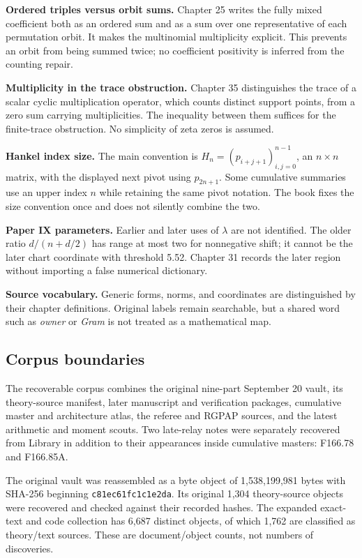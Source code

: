 \documentclass[
  10pt,
  a4paper,
  10pt,
  oneside,
  openany]{book}
\begin{document}
\textbf{Ordered triples versus orbit sums.} Chapter 25 writes the fully
mixed coefficient both as an ordered sum and as a sum over one
representative of each permutation orbit. It makes the multinomial
multiplicity explicit. This prevents an orbit from being summed twice;
no coefficient positivity is inferred from the counting repair.

\textbf{Multiplicity in the trace obstruction.} Chapter 35 distinguishes
the trace of a scalar cyclic multiplication operator, which counts
distinct support points, from a zero sum carrying multiplicities. The
inequality between them suffices for the finite-trace obstruction. No
simplicity of zeta zeros is assumed.

\textbf{Hankel index size.} The main convention is
\(H_n=(p_{i+j+1})_{i,j=0}^{n-1}\), an \(n\times n\) matrix, with the
displayed next pivot using \(p_{2n+1}\). Some cumulative summaries use
an upper index \(n\) while retaining the same pivot notation. The book
fixes the size convention once and does not silently combine the two.

\textbf{Paper IX parameters.} Earlier and later uses of \(\lambda\) are
not identified. The older ratio \(d/(n+d/2)\) has range at most two for
nonnegative shift; it cannot be the later chart coordinate with
threshold 5.52. Chapter 31 records the later region without importing a
false numerical dictionary.

\textbf{Source vocabulary.} Generic forms, norms, and coordinates are
distinguished by their chapter definitions. Original labels remain
searchable, but a shared word such as \emph{owner} or \emph{Gram} is not
treated as a mathematical map.

\subsection{Corpus boundaries}\label{corpus-boundaries}

The recoverable corpus combines the original nine-part September 20
vault, its theory-source manifest, later manuscript and verification
packages, cumulative master and architecture atlas, the referee and
RGPAP sources, and the latest arithmetic and moment scouts. Two
late-relay notes were separately recovered from Library in addition to
their appearances inside cumulative masters: F166.78 and F166.85A.

The original vault was reassembled as a byte object of 1,538,199,981
bytes with SHA-256 beginning \texttt{c81ec61fc1c1e2da}. Its original
1,304 theory-source objects were recovered and checked against their
recorded hashes. The expanded exact-text and code collection has 6,687
distinct objects, of which 1,762 are classified as theory/text sources.
These are document/object counts, not numbers of discoveries.
\end{document}

